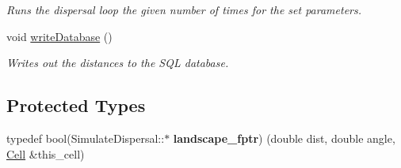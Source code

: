 \begin{DoxyCompactItemize}
\begin{DoxyCompactList}\small\item\em Runs the dispersal loop the given number of times for the set parameters. \end{DoxyCompactList}\item 
void \hyperlink{class_simulate_dispersal_a09f105b0f785aa9f371dd02134b86381}{write\+Database} ()\hypertarget{class_simulate_dispersal_a09f105b0f785aa9f371dd02134b86381}{}\label{class_simulate_dispersal_a09f105b0f785aa9f371dd02134b86381}

\begin{DoxyCompactList}\small\item\em Writes out the distances to the S\+QL database. \end{DoxyCompactList}\end{DoxyCompactItemize}
\subsection*{Protected Types}
\begin{DoxyCompactItemize}
\item 
typedef bool(Simulate\+Dispersal\+::$\ast$ {\bfseries landscape\+\_\+fptr}) (double dist, double angle, \hyperlink{struct_cell}{Cell} \&this\+\_\+cell)\hypertarget{class_simulate_dispersal_a0dc8b1420597298bafffac2beac3a14c}{}\label{class_simulate_dispersal_a0dc8b1420597298bafffac2beac3a14c}

\end{DoxyCompactItemize}
